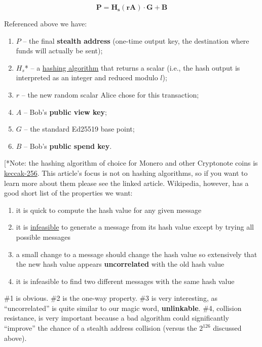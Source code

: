 \[
	\mathbf{P = H_s(rA)\cdot G+B}
\]

Referenced above we have:
	\begin{enumerate}
		\item \(P\) -- the final \textbf{stealth address} (one-time output key, the destination where funds will actually be sent);
		\item \(H_s\)* -- a \href{https://en.wikipedia.org/wiki/Cryptographic_hash_function}{hashing algorithm} that returns a scalar (i.e., the hash output is interpreted as an integer and reduced modulo \(l\));
		\item \(r\) -- the new random scalar Alice chose for this transaction;
		\item \(A\) -- Bob's \textbf{public view key};
		\item \(G\) -- the standard Ed25519 base point;
		\item \(B\) -- Bob's \textbf{public spend key}.
	\end{enumerate}

	[*Note: the hashing algorithm of choice for Monero and other Cryptonote coins is \href{https://en.wikipedia.org/w/index.php?title=SHA-3&diff=674814400&oldid=674650199#Examples_of_SHA-3_and_Keccak_variants}{keccak-256}. This article's focus is not on hashing algorithms, so if you want to learn more about them please see the linked article. Wikipedia, however, has a good short list of the properties we want:

	\begin{enumerate}
		\item it is quick to compute the hash value for any given message
		\item it is \href{https://en.wikipedia.org/wiki/Computational_complexity_theory#Intractability}{infeasible} to generate a message from its hash value except by trying all possible messages
		\item a small change to a message should change the hash value so extensively that the new hash value appears \textbf{uncorrelated} with the old hash value
		\item it is infeasible to find two different messages with the same hash value
	\end{enumerate}
	\#1 is obvious. \#2 is the one-way property. \#3 is very interesting, as ``uncorrelated'' is quite similar to our magic word, \textbf{unlinkable}. \#4, collision resistance, is very important because a bad algorithm could significantly ``improve'' the chance of a stealth address collision (versus the \(2^{126}\) discussed above).\par


